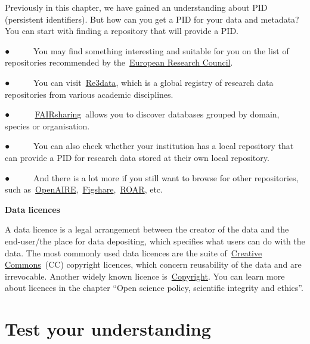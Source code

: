 \documentclass[
]{book}
\begin{document}
Previously in this chapter, we have gained an understanding about PID (persistent identifiers). But how can you get a PID for your data and metadata? You can start with finding a repository that will provide a PID.

● ~ ~ ~ You may find something interesting and suitable for you on the list of repositories recommended by the~\href{https://erc.europa.eu/funding-and-grants/managing-project/open-access}{}\href{https://erc.europa.eu/funding-and-grants/managing-project/open-access}{European Research Council}.

● ~ ~ ~ You can visit~\href{https://www.re3data.org/}{}\href{https://www.re3data.org/}{Re3data}, which is a global registry of research data repositories from various academic disciplines.

● ~ ~ ~~\href{https://fairsharing.org/search?fairsharingRegistry=Database}{}\href{https://fairsharing.org/search?fairsharingRegistry=Database}{FAIRsharing}~allows you to discover databases grouped by domain, species or organisation.

● ~ ~ ~ You can also check whether your institution has a local repository that can provide a PID for research data stored at their own local repository.

● ~ ~ ~ And there is a lot more if you still want to browse for other repositories, such as~\href{https://explore.openaire.eu/participate/deposit/learn-how}{}\href{https://explore.openaire.eu/participate/deposit/learn-how}{OpenAIRE},~\href{https://figshare.com/}{}\href{https://figshare.com/}{Figshare},~\href{http://roar.eprints.org/}{}\href{http://roar.eprints.org/}{ROAR}, etc.

\textbf{Data licences}

A data licence is a legal arrangement between the creator of the data and the end-user/the place for data depositing, which specifies what users can do with the data. The most commonly used data licences are the suite of~\href{https://en.wikipedia.org/wiki/Creative_Commons}{}\href{https://en.wikipedia.org/wiki/Creative_Commons}{Creative Commons}~(CC) copyright licences, which concern reusability of the data and are irrevocable. Another widely known licence is~\href{https://en.wikipedia.org/wiki/Copyright}{}\href{https://en.wikipedia.org/wiki/Copyright}{Copyright}. You can learn more about licences in the chapter ``Open science policy, scientific integrity and ethics''.

\hypertarget{test-your-understanding-5}{%
\section{Test your understanding}\label{test-your-understanding-5}}
\end{document}
